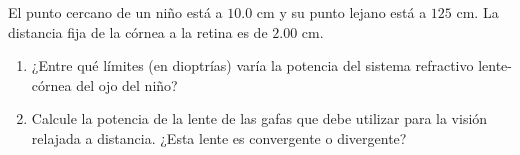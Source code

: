 \item El punto cercano de un niño está a $10.0\text{ cm}$ y su punto lejano está a $125\text{ cm}$. La distancia fija de la córnea a la retina es de $2.00\text{ cm}$.
\begin{enumerate}
    \item ¿Entre qué límites (en dioptrías) varía la potencia del sistema refractivo lente-córnea del ojo del niño?
    \item Calcule la potencia de la lente de las gafas que debe utilizar para la visión relajada a distancia. ¿Esta lente es convergente o divergente?
\end{enumerate}